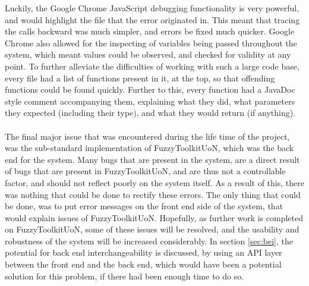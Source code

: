 Luckily, the Google Chrome JavaScript debugging functionality is very powerful, and would highlight the file that the error originated in. This meant that tracing the calls backward was much simpler, and errors be fixed much quicker. Google Chrome also allowed for the inspecting of variables being passed throughout the system, which meant values could be observed, and checked for validity at any point. To further alleviate the difficulties of working with such a large code base, every file had a list of functions present in it, at the top, so that offending functions could be found quickly. Further to this, every function had a JavaDoc style comment accompanying them, explaining what they did, what parameters they expected (including their type), and what they would return (if anything).\ \\
\ \\
The final major issue that was encountered during the life time of the project, was the sub-standard implementation of FuzzyToolkitUoN, which was the back end for the system. Many bugs that are present in the system, are a direct result of bugs that are present in FuzzyToolkitUoN, and are thus not a controllable factor, and should not reflect poorly on the system itself. As a result of this, there was nothing that could be done to rectify these errors. The only thing that could be done, was to put error messages on the front end side of the system, that would explain issues of FuzzyToolkitUoN. Hopefully, as further work is completed on FuzzyToolkitUoN, some of these issues will be resolved, and the usability and robustness of the system will be increased considerably. In section \ref{sec:bei}, the potential for back end interchangeability is discussed, by using an API layer between the front end and the back end, which would have been a potential solution for this problem, if there had been enough time to do so. 
